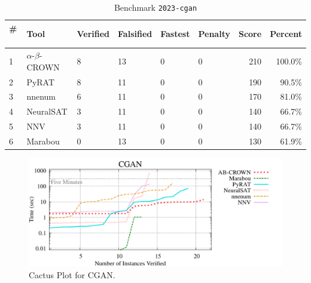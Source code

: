 \begin{table}[h]
\begin{center}
\caption{Benchmark \texttt{2023-cgan}} \label{tab:cat_{cat}}
{\setlength{\tabcolsep}{2pt}
\begin{tabular}[h]{@{}llllllrr@{}}
\toprule
\textbf{\# ~} & \textbf{Tool} & \textbf{Verified} & \textbf{Falsified} & \textbf{Fastest} & \textbf{Penalty} & \textbf{Score} & \textbf{Percent}\\
\midrule
1 & $\alpha$-$\beta$-CROWN & 8 & 13 & 0 & 0 & 210 & 100.0\% \\
2 & PyRAT & 8 & 11 & 0 & 0 & 190 & 90.5\% \\
3 & nnenum & 6 & 11 & 0 & 0 & 170 & 81.0\% \\
4 & NeuralSAT & 3 & 11 & 0 & 0 & 140 & 66.7\% \\
5 & NNV & 3 & 11 & 0 & 0 & 140 & 66.7\% \\
6 & Marabou & 0 & 13 & 0 & 0 & 130 & 61.9\% \\
\bottomrule
\end{tabular}
}
\end{center}
\end{table}



\begin{figure}[h]
\centerline{\includegraphics[width=\textwidth]{cactus/2023_cgan.pdf}}
\caption{Cactus Plot for CGAN.}
\label{fig:quantPic}
\end{figure}




